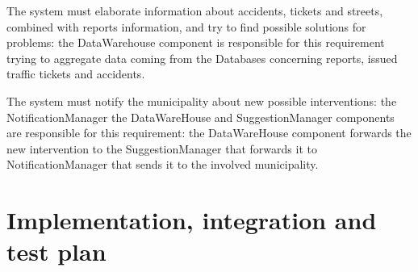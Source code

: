 \documentclass[a4paper]{report}
\begin{document}
\begin{enumerate}[start=1,label={[R\arabic*]}]
\item The system must elaborate information about accidents, tickets and streets, combined with reports information, and try to find possible solutions for problems: the DataWarehouse component is responsible for this requirement trying to aggregate data coming from the Databases concerning reports, issued traffic tickets and accidents.
\item The system must notify the municipality about new possible interventions: the NotificationManager the DataWareHouse and SuggestionManager components are responsible for this requirement: the DataWareHouse component forwards the new intervention to the SuggestionManager that forwards it to NotificationManager that sends it to  the involved municipality.

\end{enumerate}

\chapter{Implementation, integration and test plan}
\end{document}

